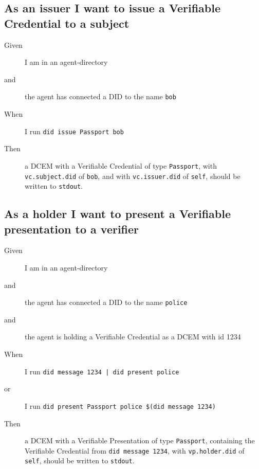 \subsection{As an issuer I want to issue a Verifiable Credential to a subject}
\begin{description}\begin{description}
    \item[Given] I am in an agent-directory
    \item[and] the agent has connected a DID to the name \texttt{bob}
    \item[When] I run \texttt{did issue Passport bob}
    \item[Then] a DCEM with a Verifiable Credential of type \texttt{Passport}, with \texttt{vc.subject.did} of \texttt{bob}, and with \texttt{vc.issuer.did} of \texttt{self}, should be written to \texttt{stdout}.
\end{description}\end{description}



\subsection{As a holder I want to present a Verifiable presentation to a verifier}
\begin{description}\begin{description}
    \item[Given] I am in an agent-directory
    \item[and] the agent has connected a DID to the name \texttt{police}
    \item[and] the agent is holding a Verifiable Credential as a DCEM with id 1234
    \item[When] I run \texttt{did message 1234 | did present police}
    \item[or] I run \texttt{did present Passport police \$(did message 1234)}
    \item[Then] a DCEM with a Verifiable Presentation of type \texttt{Passport}, containing the Verifiable Credential from \texttt{did message 1234}, with \texttt{vp.holder.did} of \texttt{self}, should be written to \texttt{stdout}.
\end{description}\end{description}



